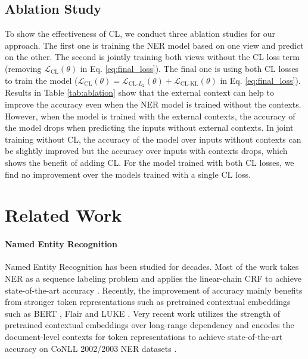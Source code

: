 \documentclass[11pt,a4paper]{article}
\newcommand{\mcL}{\mathcal{L}}
\begin{document}
\subsection{Ablation Study}
To show the effectiveness of CL, we conduct three ablation studies for our approach. The first one is training the NER model based on one view and predict on the other. The second is jointly training both views without the CL loss term (removing $\mcL_{\text{CL}}(\theta)$ in Eq. \ref{eq:final_loss}). The final one is using both CL losses to train the model ($\mcL_{\text{CL}}(\theta)=\mcL_{\text{CL-$L_2$}}(\theta)+\mcL_{\text{CL-KL}}(\theta)$ in Eq. \ref{eq:final_loss}). Results in Table \ref{tab:ablation} show that the external context can help to improve the accuracy even when the NER model is trained without the contexts. However, when the model is trained with the external contexts, the accuracy of the model drops when predicting the inputs without external contexts. In joint training without CL, the accuracy of the model over inputs without contexts can be slightly improved but the accuracy over inputs with contexts drops, which shows the benefit of adding CL. For the model trained with both CL losses, we find no improvement over the models trained with a single CL loss. 


\section{Related Work}
\paragraph{Named Entity Recognition}
Named Entity Recognition \citep{Sundheim1995NamedET} has been studied for decades. Most of the work takes NER as a sequence labeling problem and applies the linear-chain CRF \citep{10.5555/645530.655813} to achieve state-of-the-art accuracy \citep{ma-hovy-2016-end,lample-etal-2016-neural,akbik-etal-2018-contextual,akbik-etal-2019-pooled,wang-etal-2020-more}. 
Recently, the improvement of accuracy mainly benefits from stronger token representations such as pretrained contextual embeddings such as BERT \citep{devlin-etal-2019-bert}, Flair \citep{akbik-etal-2018-contextual} and LUKE \citep{yamada-etal-2020-luke}. Very recent work \citep{yu-etal-2020-named,yamada-etal-2020-luke} utilizes the strength of pretrained contextual embeddings over long-range dependency and encodes the document-level contexts for token representations to achieve state-of-the-art accuracy on CoNLL 2002/2003 NER datasets \citep{tjong-kim-sang-2002-introduction,tjong-kim-sang-de-meulder-2003-introduction}. 
\end{document}
